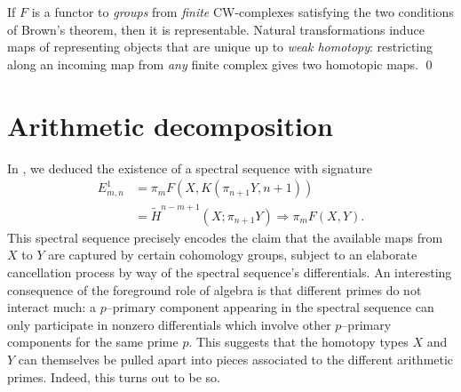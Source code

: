 \begin{theorem}[Adams]
If $F$ is a functor to \emph{groups} from \emph{finite} CW-complexes satisfying the two conditions of Brown's theorem, then it is representable.
Natural transformations induce maps of representing objects that are unique up to \emph{weak homotopy}: restricting along an incoming map from \emph{any} finite complex gives two homotopic maps. \qed
{}
\end{theorem}



\section{Arithmetic decomposition}


In , we deduced the existence of a spectral sequence with signature
\begin{align*}
E^1_{m, n} & = \pi_m F(X, K(\pi_{n+1} Y, n+1)) \\
& = \widetilde H^{n-m+1}(X; \pi_{n+1} Y) \Rightarrow \pi_m F(X, Y).
\end{align*}
This spectral sequence precisely encodes the claim that the available maps from $X$ to $Y$ are captured by certain cohomology groups, subject to an elaborate cancellation process by way of the spectral sequence's differentials.
An interesting consequence of the foreground role of algebra is that different primes do not interact much: a $p$--primary component appearing in the spectral sequence can only participate in nonzero differentials which involve other $p$--primary components for the same prime $p$.
This suggests that the homotopy types $X$ and $Y$ can themselves be pulled apart into pieces associated to the different arithmetic primes.
Indeed, this turns out to be so.

